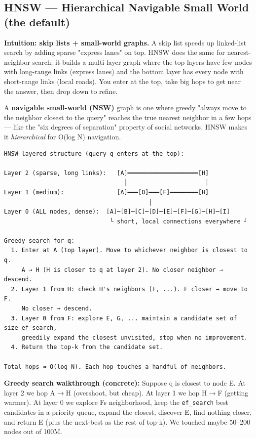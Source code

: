 \documentclass[11pt]{article}
\begin{document}
\subsection{HNSW --- Hierarchical Navigable Small World (the default)}\label{hnsw--hierarchical-navigable-small-world-the-default}

\textbf{Intuition: skip lists + small-world graphs.} A skip list speeds up linked-list search by adding sparse "express lanes" on top. HNSW does the same for nearest-neighbor search: it builds a multi-layer graph where the top layers have few nodes with long-range links (express lanes) and the bottom layer has every node with short-range links (local roads). You enter at the top, take big hops to get near the answer, then drop down to refine.

A \textbf{navigable small-world (NSW)} graph is one where greedy "always move to the neighbor closest to the query" reaches the true nearest neighbor in a few hops --- like the "six degrees of separation" property of social networks. HNSW makes it \emph{hierarchical} for O(log N) navigation.

\setcodelang{}

\begin{verbatim}
HNSW layered structure (query q enters at the top):

Layer 2 (sparse, long links):   [A]━━━━━━━━━━━━━━━━━━━━[H]
                                  │                      │
Layer 1 (medium):               [A]━━━[D]━━━[F]━━━━━━━━[H]
                                         │
Layer 0 (ALL nodes, dense):  [A]─[B]─[C]─[D]─[E]─[F]─[G]─[H]─[I]
                              └ short, local connections everywhere ┘

Greedy search for q:
  1. Enter at A (top layer). Move to whichever neighbor is closest to q.
     A → H (H is closer to q at layer 2). No closer neighbor → descend.
  2. Layer 1 from H: check H's neighbors (F, ...). F closer → move to F.
     No closer → descend.
  3. Layer 0 from F: explore E, G, ... maintain a candidate set of size ef_search,
     greedily expand the closest unvisited, stop when no improvement.
  4. Return the top-k from the candidate set.

Total hops ≈ O(log N). Each hop touches a handful of neighbors.
\end{verbatim}

\textbf{Greedy search walkthrough (concrete):} Suppose q is closest to node E. At layer 2 we hop A\(\rightarrow\)H (overshoot, but cheap). At layer 1 we hop H\(\rightarrow\)F (getting warmer). At layer 0 we explore F\textquotesingle s neighborhood, keep the \texttt{ef\_search} best candidates in a priority queue, expand the closest, discover E, find nothing closer, and return E (plus the next-best as the rest of top-k). We touched maybe 50--200 nodes out of 100M.
\end{document}
